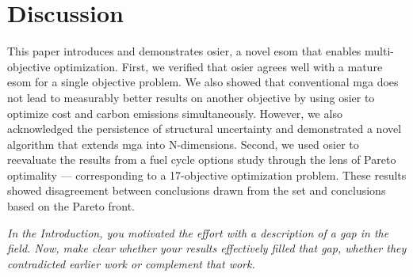 \section{Discussion}


This paper introduces and demonstrates \gls{osier}, a novel \gls{esom} that
enables multi-objective optimization. First, we verified that \gls{osier} agrees
well with a mature \gls{esom} for a single objective problem. We also showed
that conventional \gls{mga} does not lead to measurably better results on
another objective by using \gls{osier} to optimize cost and carbon emissions
simultaneously. However, we also acknowledged the persistence of structural
uncertainty and demonstrated a novel algorithm that extends \gls{mga} into
N-dimensions. Second, we used \gls{osier} to reevaluate the results from a fuel
cycle options study through the lens of Pareto optimality --- corresponding to a
17-objective optimization problem. These results showed disagreement between
conclusions drawn from the \gls{set} and conclusions based on the Pareto front. 

\emph{In the Introduction, you motivated the effort with a description
                of a gap in the field. Now, make clear whether your results
                effectively filled that gap, whether they contradicted earlier
                work or complement that work. }

